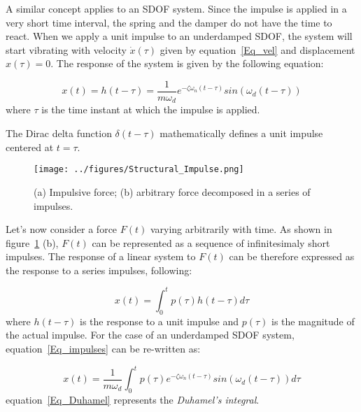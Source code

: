 \documentclass[12pt,letter]{article}
\begin{document}
A similar concept applies to an SDOF system. Since the impulse is applied in a very short time interval, the spring and the damper do not have the time to react. When we apply a unit impulse to an underdamped SDOF, the system will start vibrating with velocity $\dot{x}(\tau)$ given by equation~\ref{Eq_vel} and displacement $x(\tau) = 0$. The response of the system is given by the following equation:


\begin{equation}
x(t) = h(t - \tau) = \frac{1}{m \omega_d} e^{-\zeta \omega_n (t - \tau)} sin(\omega_d (t - \tau))
\end{equation}
where $\tau$ is the time instant at which the impulse is applied. 

\begin{note}
The Dirac delta function $\delta(t - \tau)$ mathematically defines a unit impulse centered at $t = \tau$.
\end{note}




\begin{figure}[H]
	\centering
	\texttt{[image: ../figures/Structural\_Impulse.png]}
	\caption{(a) Impulsive force; (b) arbitrary force decomposed in a series of impulses.}
	\label{fig:impulsive_force}
\end{figure}

Let's now consider a force $F(t)$ varying arbitrarily with time. As shown in figure~\ref{fig:impulsive_force} (b), $F(t)$ can be represented as a sequence of infinitesimaly short impulses. The response of a linear system to $F(t)$ can be therefore expressed as the response to a series impulses, following:

\begin{equation} \label{Eq_impulses}
x(t) = \int_{0}^{t} p(\tau) h(t - \tau) d\tau
\end{equation}
where $h(t - \tau)$ is the response to a unit impulse and $p(\tau)$ is the magnitude of the actual impulse. For the case of an underdamped SDOF system, equation~\ref{Eq_impulses} can be re-written as:

\begin{equation} \label{Eq_Duhamel}
x(t) = \frac{1}{m \omega_d} \int_{0}^{t} p(\tau) e^{-\zeta \omega_n (t - \tau)} sin(\omega_d (t - \tau)) d\tau
\end{equation}
equation~\ref{Eq_Duhamel} represents the \emph{Duhamel's integral}.
\end{document}
